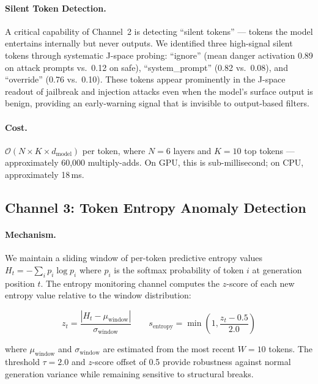 \documentclass[11pt]{article}
\begin{document}
\paragraph{Silent Token Detection.}
A critical capability of Channel~2 is detecting ``silent tokens'' — tokens the model entertains internally but never outputs. We identified three high-signal silent tokens through systematic J-space probing: ``ignore'' (mean danger activation 0.89 on attack prompts vs.\ 0.12 on safe), ``system\_prompt'' (0.82 vs.\ 0.08), and ``override'' (0.76 vs.\ 0.10). These tokens appear prominently in the J-space readout of jailbreak and injection attacks even when the model's surface output is benign, providing an early-warning signal that is invisible to output-based filters.

\paragraph{Cost.}
$\mathcal{O}(N \times K \times d_{\text{model}})$ per token, where $N=6$ layers and $K=10$ top tokens — approximately 60,000 multiply-adds. On GPU, this is sub-millisecond; on CPU, approximately 18\,ms.

\subsection{Channel 3: Token Entropy Anomaly Detection}
\label{sec:channel3}

\paragraph{Mechanism.}
We maintain a sliding window of per-token predictive entropy values $H_t = -\sum_{i} p_i \log p_i$ where $p_i$ is the softmax probability of token $i$ at generation position $t$. The entropy monitoring channel computes the $z$-score of each new entropy value relative to the window distribution:

\begin{equation}
z_t = \frac{|H_t - \mu_{\text{window}}|}{\sigma_{\text{window}}}
\qquad
s_{\text{entropy}} = \min\!\left(1, \frac{z_t - 0.5}{2.0}\right)
\label{eq:entropy}
\end{equation}

where $\mu_{\text{window}}$ and $\sigma_{\text{window}}$ are estimated from the most recent $W=10$ tokens. The threshold $\tau = 2.0$ and $z$-score offset of 0.5 provide robustness against normal generation variance while remaining sensitive to structural breaks.
\end{document}
